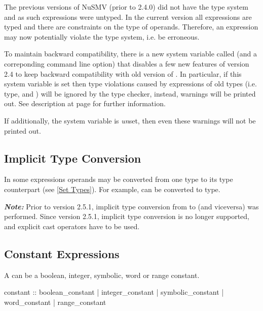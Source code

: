 The previous versions of NuSMV (prior to 2.4.0) did not have the type
system and as such expressions were untyped. 
%
In the current version all expressions are typed and there are
constraints on the type of operands. 
%
Therefore, an expression may now potentially violate the type system,
i.e. be erroneous.

To maintain backward compatibility, there is a new system variable
called  (and a correponding 
command line option) that disables a few new features of version 2.4
to keep backward compatibility with old version of
\nusmv. In particular, if this system variable is set then type violations 
caused by expressions of old types (i.e. \Enum type, \Boolean and
\Integer) will be ignored by the type checker, instead, warnings will
be printed out. See description at page
\pageref{ref::backwardcompatibility} for further information.

If additionally, the system variable
 is
\emph{un}set, then even these warnings will not be printed out.

\subsection{Implicit Type Conversion}
\label{Implicit Type Conversion}

In some expressions operands may be converted from one type to
its \Set type counterpart (see \ref{Set Types}). For example, \Integer
can be converted to \IntSet type.

\textbf{\textit{Note:}} Prior to version 2.5.1, implicit type 
conversion from \Integer to \Boolean (and viceversa) was
performed. Since version 2.5.1, implicit \Integer <-> \Boolean type
conversion is no longer supported, and explicit cast operators have
to be used.

\subsection{Constant Expressions}
\label{Constant Expressions}
%
%
A  can be a boolean,
integer, symbolic, word or range constant.

\begin{Grammar}
constant ::
        boolean_constant
      | integer_constant
      | symbolic_constant
      | word_constant
      | range_constant
\end{Grammar}

